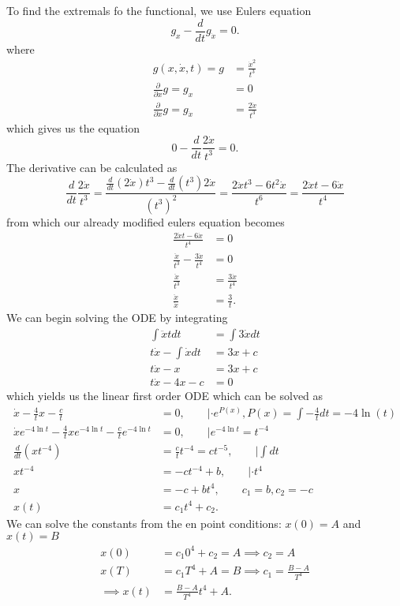 \documentclass{article}
\begin{document}
To find the extremals fo the functional, we use Eulers equation
\begin{equation}
	g_x-\frac{d}{dt}g_{\dot{x}} = 0.
\end{equation}
where
\begin{align}
	g(x,\dot{x},t) = g &= \frac{\dot{x}^2}{t^3}\\
	\frac{\partial}{\partial x} g= g_x &=  0 \\
	\frac{\partial}{\partial \dot{x}} g= g_{\dot{x}} &=  \frac{2\dot{x}}{t^3}
\end{align}
which gives us the equation
\begin{equation}
	0 - \frac{d}{dt} \frac{2\dot{x}}{t^3} = 0.
\end{equation}
The derivative can be calculated as
\begin{equation}
	\frac{d}{dt} \frac{2\dot{x}}{t^3} 
	= \frac{\frac{d}{dt}(2\dot{x})t^3 - \frac{d}{dt}(t^3)2\dot{x}}{(t^3)^2}
	= \frac{2\ddot{x}t^3 - 6t^2\dot{x}}{t^6}
	= \frac{2\ddot{x}t - 6\dot{x}}{t^4}
\end{equation}
from which our already modified eulers equation becomes 
\begin{align}
	\frac{2\ddot{x}t - 6\dot{x}}{t^4} &= 0\\
	\frac{\ddot{x}}{t^3} - \frac{3\dot{x}}{t^4} &= 0\\
	\frac{\ddot{x}}{t^3} &= \frac{3\dot{x}}{t^4} \\
	\frac{\ddot{x}}{\dot{x}} &= \frac{3}{t}.
\end{align}
We can begin solving the ODE by integrating
\begin{align}
	\int\ddot{x} t dt &= \int3 \dot{x}dt\\
	t\dot{x} - \int \dot{x} dt &= 3 x + c\\
	t\dot{x} - x &= 3x +c\\
	t\dot{x} - 4x -c &= 0
\end{align}
which yields us the linear first order ODE which can be solved as 
\begin{align}
	\dot{x} - \frac{4}{t}x - \frac{c}{t} &= 0, \qquad |\cdot e^{P(x)},P(x) = \int-\frac{4}{t}dt = -4\ln(t)\\
	\dot{x}e^{-4\ln{t}} - \frac{4}{t}xe^{-4\ln{t}} - \frac{c}{t}e^{-4\ln{t}} &= 0, \qquad | e^{-4\ln{t}} = t^{-4}\\
	\frac{d}{dt}\left(xt^{-4}\right) &= \frac{c}{t}t^{-4} = ct^{-5}, \qquad |\int dt\\
	xt^{-4} &= -ct^{-4} +b, \qquad |\cdot t^4\\
	x &= -c +bt^4, \qquad c_1 = b, c_2 = -c \\
	x(t) &= c_1 t^4 + c_2.
\end{align}
We can solve the constants from the en point conditions: $x(0) = A$ and $x(t) = B$
\begin{align}
	x(0) &= c_1 0^4 + c_2  = A \implies c_2 = A\\
	x(T) &= c_1 T^4 + A = B \implies c_1 = \frac{B-A}{T^4} \\
	\implies x(t) &= \frac{B-A}{T^4} t^4 + A.
\end{align}
\end{document}
